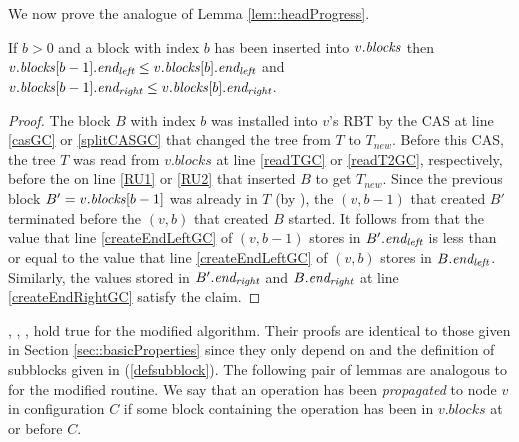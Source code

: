 We now prove the analogue of Lemma \ref{lem::headProgress}.
\begin{lemma}
 If $b>0$ and a block with index $b$ has been inserted into $v.\mbox{\textit{blocks}}$ then 
 $v.\mbox{\textit{blocks}}[b-1].\mbox{\textit{end\textsubscript{left}}} \leq v.\mbox{\textit{blocks}}[b].\mbox{\textit{end\textsubscript{left}}}$ and 
 $v.\mbox{\textit{blocks}}[b-1].\mbox{\textit{end\textsubscript{right}}} \leq v.\mbox{\textit{blocks}}[b].\mbox{\textit{end\textsubscript{right}}}$.
\end{lemma}
\begin{proof}
The block $B$ with index $b$ was installed into $v$'s RBT by the CAS at line \ref{casGC} or \ref{splitCASGC} 
that changed the tree from $T$ to $T_{new}$.
Before this CAS, the tree $T$ was read from $v.blocks$ at line \ref{readTGC} or \ref{readT2GC}, respectively,
before the  on line \ref{RU1} or \ref{RU2} that inserted $B$ to get $T_{new}$.
Since the previous block $B'=v.\mbox{\textit{blocks}}[b-1]$ was already in $T$ (by ),
the $(v,b-1)$ that created $B'$ terminated before the $(v,b)$ that created $B$ started.
It follows from  that the value that line \ref{createEndLeftGC} of $(v,b-1)$ stores in $B'.\mbox{\textit{end\textsubscript{left}}}$ is less than or equal to the value that line \ref{createEndLeftGC} of $(v,b)$ stores in $B.\mbox{\textit{end\textsubscript{left}}}$.  Similarly, the values stored in $B'.\mbox{\textit{end\textsubscript{right}}}$ and $B.\mbox{\textit{end\textsubscript{right}}}$ at line \ref{createEndRightGC} satisfy the claim.
\end{proof}

, , ,  
hold true for the modified algorithm.  Their proofs are identical to those given in 
Section \ref{sec::basicProperties} since they only depend on  
and the definition of subblocks given in (\ref{defsubblock}).
The following pair of lemmas are analogous to  for the modified  routine.
We say that an operation has been \emph{propagated} to node $v$ in configuration $C$ if
some block containing the operation has been in $v.blocks$ at or before $C$.

